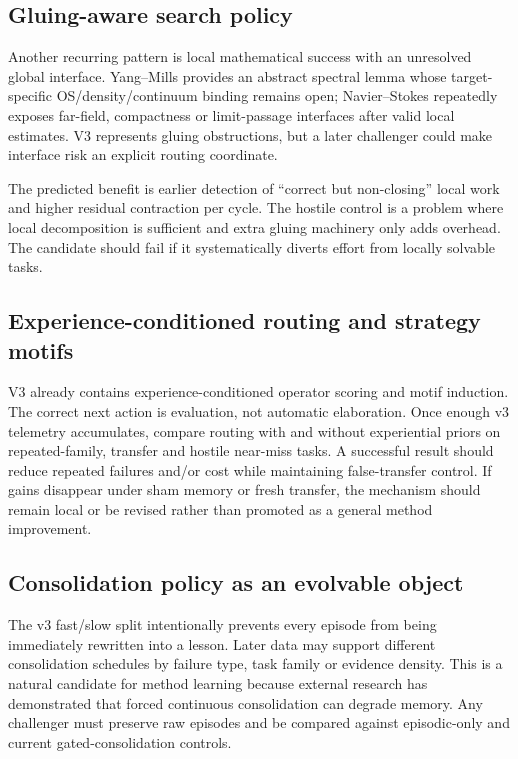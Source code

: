\subsection{Gluing-aware search policy}

Another recurring pattern is local mathematical success with an unresolved global interface. Yang--Mills provides an abstract spectral lemma whose target-specific OS/density/continuum binding remains open; Navier--Stokes repeatedly exposes far-field, compactness or limit-passage interfaces after valid local estimates. V3 represents gluing obstructions, but a later challenger could make interface risk an explicit routing coordinate.

The predicted benefit is earlier detection of ``correct but non-closing'' local work and higher residual contraction per cycle. The hostile control is a problem where local decomposition is sufficient and extra gluing machinery only adds overhead. The candidate should fail if it systematically diverts effort from locally solvable tasks.

\subsection{Experience-conditioned routing and strategy motifs}

V3 already contains experience-conditioned operator scoring and motif induction. The correct next action is evaluation, not automatic elaboration. Once enough v3 telemetry accumulates, compare routing with and without experiential priors on repeated-family, transfer and hostile near-miss tasks. A successful result should reduce repeated failures and/or cost while maintaining false-transfer control. If gains disappear under sham memory or fresh transfer, the mechanism should remain local or be revised rather than promoted as a general method improvement.

\subsection{Consolidation policy as an evolvable object}

The v3 fast/slow split intentionally prevents every episode from being immediately rewritten into a lesson. Later data may support different consolidation schedules by failure type, task family or evidence density. This is a natural candidate for method learning because external research has demonstrated that forced continuous consolidation can degrade memory. Any challenger must preserve raw episodes and be compared against episodic-only and current gated-consolidation controls.

